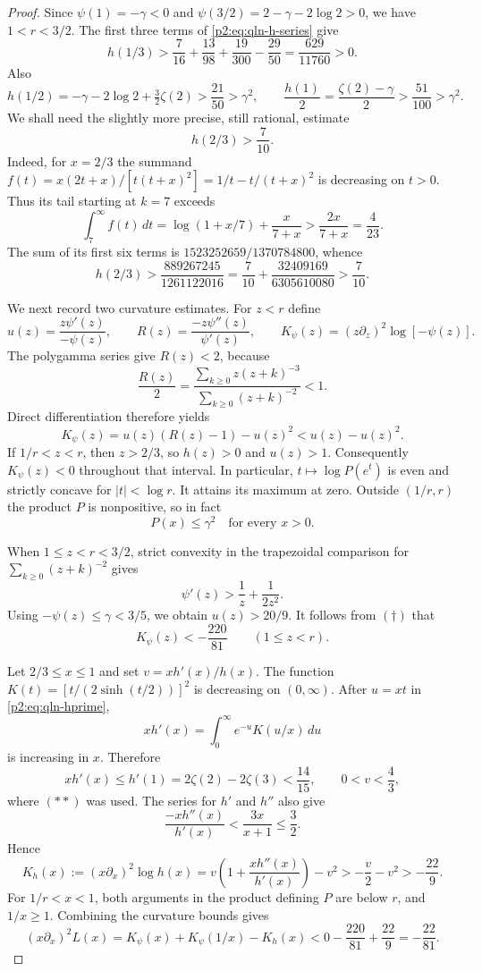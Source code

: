 \documentclass[11pt,a4paper]{article}
\theoremstyle{definition}
\theoremstyle{remark}
\numberwithin{equation}{section}
\begin{document}
\begin{proof}
Since $\psi(1)=-\gamma<0$ and
$\psi(3/2)=2-\gamma-2\log2>0$, we have $1<r<3/2$.
The first three terms of \eqref{p2:eq:qln-h-series} give
\[
 h(1/3)>\frac7{16}+\frac{13}{98}+\frac{19}{300}-\frac{29}{50}
       =\frac{629}{11760}>0.
\]
Also
\[
 h(1/2)=-\gamma-2\log2+\tfrac32\zeta(2)
     >\frac{21}{50}>\gamma^2,
 \qquad \frac{h(1)}2=\frac{\zeta(2)-\gamma}{2}
     >\frac{51}{100}>\gamma^2.                 \tag{\(*\)}
\]
We shall need the slightly more precise, still rational, estimate
\[
 h(2/3)>\frac7{10}.                            \tag{\(**\)}
\]
Indeed, for $x=2/3$ the summand
$f(t)=x(2t+x)/[t(t+x)^2]=1/t-t/(t+x)^2$ is decreasing on $t>0$.
Thus its tail starting at $k=7$ exceeds
\[
 \int_7^\infty f(t)\,dt
 =\log(1+x/7)+\frac{x}{7+x}>\frac{2x}{7+x}=\frac4{23}.
\]
The sum of its first six terms is $1523252659/1370784800$, whence
\[
 h(2/3)>\frac{889267245}{1261122016}
       =\frac7{10}+\frac{32409169}{6305610080}>\frac7{10}.
\]

We next record two curvature estimates.  For $z<r$ define
\[
 u(z)=\frac{z\psi'(z)}{-\psi(z)},\qquad
 R(z)=\frac{-z\psi''(z)}{\psi'(z)},\qquad
 K_\psi(z)=(z\partial_z)^2\log[-\psi(z)].
\]
The polygamma series give $R(z)<2$, because
\[
 \frac{R(z)}2=
 \frac{\sum_{k\ge0}z(z+k)^{-3}}{\sum_{k\ge0}(z+k)^{-2}}<1.
\]
Direct differentiation therefore yields
\[
 K_\psi(z)=u(z)(R(z)-1)-u(z)^2<u(z)-u(z)^2.    \tag{\(\dagger\)}
\]
If $1/r<z<r$, then $z>2/3$, so $h(z)>0$ and $u(z)>1$.
Consequently $K_\psi(z)<0$ throughout that interval.
In particular, $t\mapsto\log P(e^t)$ is even and strictly concave for
$|t|<\log r$.  It attains its maximum at zero.  Outside $(1/r,r)$
the product $P$ is nonpositive, so in fact
\[
 P(x)\le\gamma^2\quad\text{for every }x>0.     \tag{\(\ddagger\)}
\]

When $1\le z<r<3/2$, strict convexity in the trapezoidal comparison for
$\sum_{k\ge0}(z+k)^{-2}$ gives
\[
 \psi'(z)>\frac1z+\frac1{2z^2}.
\]
Using $-\psi(z)\le\gamma<3/5$, we obtain $u(z)>20/9$.  It follows from
\((\dagger)\) that
\[
 K_\psi(z)<-\frac{220}{81}\qquad(1\le z<r).   \tag{\(\dagger\dagger\)}
\]

Let $2/3\le x\le1$ and set $v=xh'(x)/h(x)$.  The function
$K(t)=[t/(2\sinh(t/2))]^2$ is decreasing on $(0,\infty)$.
After $u=xt$ in \eqref{p2:eq:qln-hprime},
\[
 xh'(x)=\int_0^\infty e^{-u}K(u/x)\,du
\]
is increasing in $x$.  Therefore
\[
 xh'(x)\le h'(1)=2\zeta(2)-2\zeta(3)<\frac{14}{15},
 \qquad 0<v<\frac43,
\]
where \((**)\) was used.  The series for $h'$ and $h''$ also give
\[
 \frac{-xh''(x)}{h'(x)}<\frac{3x}{x+1}\le\frac32.
\]
Hence
\[
 K_h(x):=(x\partial_x)^2\log h(x)
 =v\left(1+\frac{xh''(x)}{h'(x)}\right)-v^2
 >-\frac v2-v^2>-\frac{22}{9}.                \tag{\(\star\)}
\]
For $1/r<x<1$, both arguments in the product defining $P$ are below $r$,
and $1/x\ge1$.  Combining the curvature bounds gives
\[
 (x\partial_x)^2 L(x)
 =K_\psi(x)+K_\psi(1/x)-K_h(x)
 <0-\frac{220}{81}+\frac{22}{9}
 =-\frac{22}{81}.                            \tag{\(\star\star\)}
\]


\end{proof}
\end{document}
